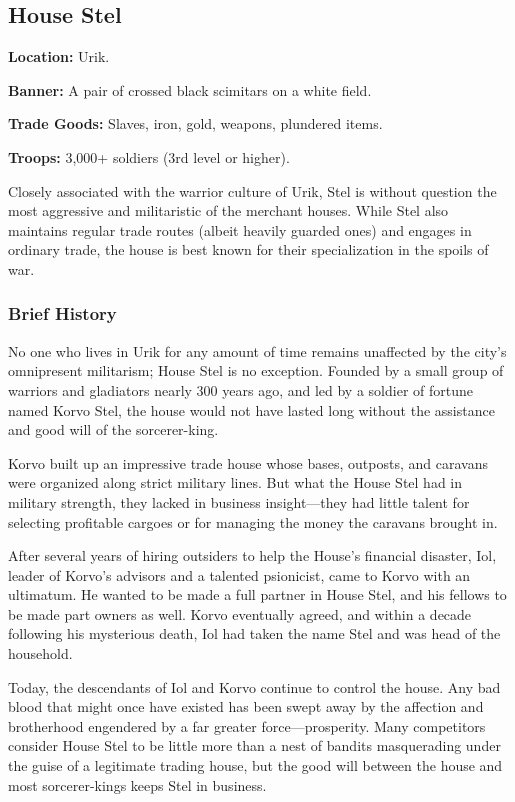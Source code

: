 \subsection{House Stel}
\textbf{Location:} Urik.

\textbf{Banner:} A pair of crossed black scimitars on a white field.

\textbf{Trade Goods:} Slaves, iron, gold, weapons, plundered items.

\textbf{Troops:} 3,000+ soldiers (3rd level or higher).

Closely associated with the warrior culture of Urik, Stel is without question the most aggressive and militaristic of the merchant houses. While Stel also maintains regular trade routes (albeit heavily guarded ones) and engages in ordinary trade, the house is best known for their specialization in the spoils of war.

\subsubsection{Brief History}
No one who lives in Urik for any amount of time remains unaffected by the city's omnipresent militarism; House Stel is no exception. Founded by a small group of warriors and gladiators nearly 300 years ago, and led by a soldier of fortune named Korvo Stel, the house would not have lasted long without the assistance and good will of the sorcerer-king.

Korvo built up an impressive trade house whose bases, outposts, and caravans were organized along strict military lines. But what the House Stel had in military strength, they lacked in business insight---they had little talent for selecting profitable cargoes or for managing the money the caravans brought in.

After several years of hiring outsiders to help the House's financial disaster, Iol, leader of Korvo's advisors and a talented psionicist, came to Korvo with an ultimatum. He wanted to be made a full partner in House Stel, and his fellows to be made part owners as well. Korvo eventually agreed, and within a decade following his mysterious death, Iol had taken the name Stel and was head of the household.

Today, the descendants of Iol and Korvo continue to control the house. Any bad blood that might once have existed has been swept away by the affection and brotherhood engendered by a far greater force---prosperity. Many competitors consider House Stel to be little more than a nest of bandits masquerading under the guise of a legitimate trading house, but the good will between the house and most sorcerer-kings keeps Stel in business.

